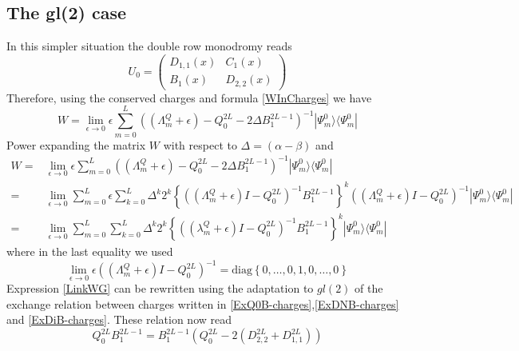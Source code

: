 \documentclass[10pt]{article}
\numberwithin{equation}{section}
\numberwithin{equation}{subsection}
\begin{document}
\subsection{The gl(2) case}
In this simpler situation the double row monodromy reads
\begin{equation}
	U_{0}=\begin{pmatrix}
		D_{1,1}(x)&C_{1}(x)\\
		B_{1}(x)&D_{2,2}(x)
	\end{pmatrix}
\end{equation}
Therefore, using the conserved charges and formula \eqref{WInCharges} we have
\begin{equation}\label{W}
	W=\lim_{\epsilon\to 0}\epsilon\sum_{m=0}^{L}\left((\Lambda_{m}^{Q}+\epsilon)-Q_{0}^{2L}-2\Delta B_{1}^{2L-1}\right)^{-1}|\Psi_{m}^{0}\rangle \langle \Psi_{m}^{0}|
\end{equation}
Power expanding the matrix $W$ with respect to $\Delta=(\alpha-\beta)$ and
\begin{equation}\label{LinkWG}
	\begin{split}
		W=&\lim_{\epsilon\to 0}\epsilon\sum_{m=0}^{L}\left((\Lambda_{m}^{Q}+\epsilon)-Q_{0}^{2L}-2\Delta B_{1}^{2L-1}\right)^{-1}|\Psi_{m}^{0}\rangle\langle \Psi_{m}^{0}|\\
		=&\lim_{\epsilon\to 0}\sum_{m=0}^{L}\epsilon\sum_{k=0}^{L}\Delta^{k}2^{k}\left\{\left((\Lambda_{m}^{Q}+\epsilon)I-Q_{0}^{2L}\right)^{-1}B_{1}^{2L-1}\right\}^{k}\left((\Lambda_{m}^{Q}+\epsilon)I-Q_{0}^{2L}\right)^{-1}|\Psi_{m}^{0}\rangle\langle \Psi_{m}^{0}|
		\\=&
		\lim_{\epsilon\to0}\sum_{m=0}^{L}\sum_{k=0}^{L}\Delta^{k}2^{k}\left\{\left((\lambda_{m}^{Q}+\epsilon)I-Q_{0}^{2L}\right)^{-1}B_{1}^{2L-1}\right\}^{k}|\Psi_{m}^{0}\rangle\langle \Psi_{m}^{0}|
	\end{split}
\end{equation}
where in the last equality we used 
\begin{equation}
	\lim_{\epsilon\to 0}\epsilon\left((\Lambda_{m}^{Q}+\epsilon)I-Q_{0}^{2L}\right)^{-1}=\text{diag}\left\{0,\ldots,0,1,0,\ldots,0\right\}
\end{equation}
Expression \eqref{LinkWG} can be rewritten using the adaptation to $gl(2)$ of the exchange relation between charges written in \eqref{ExQ0B-charges},\eqref{ExDNB-charges} and \eqref{ExDiB-charges}. These relation now read
\begin{equation}\label{exchangeQ0B}
	Q_{0}^{2L}B_{1}^{2L-1}=B_{1}^{2L-1}\left(Q_{0}^{2L}-2\left(D_{2,2}^{2L}+D_{1,1}^{2L}\right)\right)
\end{equation}
\end{document}
